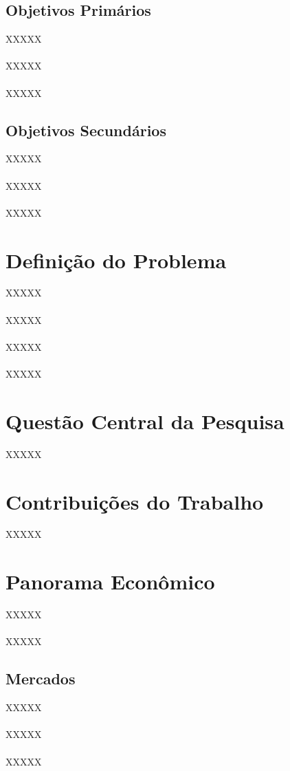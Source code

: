 \subsection{Objetivos Primários}

XXXXX
\\\\
XXXXX
\\\\
XXXXX

\subsection{Objetivos Secundários}

XXXXX
\\\\
XXXXX
\\\\
XXXXX

\section{Definição do Problema}
XXXXX
\\\\
XXXXX
\\\\
XXXXX
\\\\
XXXXX

\section{Questão Central da Pesquisa}

XXXXX

\section{Contribuições do Trabalho}

XXXXX

\section{Panorama Econômico}
XXXXX
\\\\
XXXXX

\subsection{Mercados}

XXXXX
\\\\
XXXXX
\\\\
XXXXX

